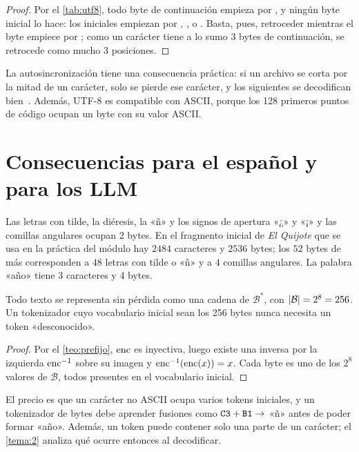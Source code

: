 \begin{proof}
Por el \cref{tab:utf8}, todo byte de continuación empieza por , y ningún byte inicial lo hace: los iniciales empiezan por , ,  o . Basta, pues, retroceder mientras el byte empiece por ; como un carácter tiene a lo sumo 3 bytes de continuación, se retrocede como mucho 3 posiciones.
\end{proof}

La autosincronización tiene una consecuencia práctica: si un archivo se corta por la mitad de un carácter, solo se pierde ese carácter, y los siguientes se decodifican bien~\cite[§2.3.2]{jm3}. Además, UTF-8 es compatible con ASCII, porque los 128 primeros puntos de código ocupan un byte con su valor ASCII.

\section{Consecuencias para el español y para los LLM}

\begin{observacion}
Las letras con tilde, la diéresis, la «ñ» y los signos de apertura «¿» y «¡» y las comillas angulares ocupan 2 bytes. En el fragmento inicial de \emph{El Quijote} que se usa en la práctica del módulo hay $2484$ caracteres y $2536$ bytes; los $52$ bytes de más corresponden a $48$ letras con tilde o «ñ» y a $4$ comillas angulares. La palabra «año» tiene 3 caracteres y 4 bytes.
\end{observacion}

\begin{corolario}\label{cor:vocab256}
Todo texto se representa sin pérdida como una cadena de $\mathcal{B}^{*}$, con $\lvert\mathcal{B}\rvert=2^{8}=256$. Un tokenizador cuyo vocabulario inicial sean los 256 bytes nunca necesita un token «desconocido».
\end{corolario}

\begin{proof}
Por el \cref{teo:prefijo}, $\operatorname{enc}$ es inyectiva, luego existe una inversa por la izquierda $\operatorname{enc}^{-1}$ sobre su imagen y $\operatorname{enc}^{-1}(\operatorname{enc}(x))=x$. Cada byte es uno de los $2^{8}$ valores de $\mathcal{B}$, todos presentes en el vocabulario inicial.
\end{proof}

El precio es que un carácter no ASCII ocupa varios tokens iniciales, y un tokenizador de bytes debe aprender fusiones como $\texttt{C3}+\texttt{B1}\to$ «ñ» antes de poder formar «año». Además, un token puede contener solo una parte de un carácter; el \cref{tema:2} analiza qué ocurre entonces al decodificar.

